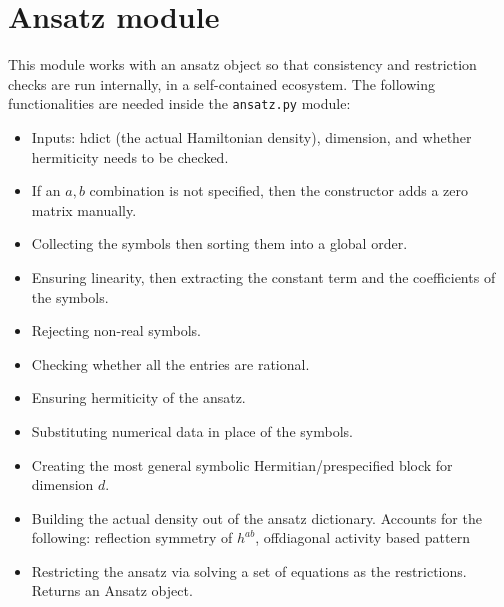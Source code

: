 \documentclass[a4paper, 11pt, twoside, onecolumn]{article}
\begin{document}
\section{Ansatz module}
This module works with an ansatz object so that consistency and restriction checks are run internally, in a self-contained ecosystem. The following functionalities are needed inside the \texttt{ansatz.py} module:
\begin{itemize}
    \item Inputs: hdict (the actual Hamiltonian density), dimension, and whether hermiticity needs to be checked.
    \item If an $a,b$ combination is not specified, then the constructor adds a zero matrix manually.
    \item Collecting the symbols then sorting them into a global order.
    \item Ensuring linearity, then extracting the constant term and the coefficients of the symbols.
    \item Rejecting non-real symbols.
    \item Checking whether all the entries are rational.
    \item Ensuring hermiticity of the ansatz.
    \item Substituting numerical data in place of the symbols.
    \item Creating the most general symbolic Hermitian/prespecified block for dimension $d$.
    \item Building the actual density out of the ansatz dictionary. Accounts for the following: reflection symmetry of $h^{ab}$, offdiagonal activity based pattern
    \item Restricting the ansatz via solving a set of equations as the restrictions. Returns an Ansatz object.
\end{itemize}
\end{document}
